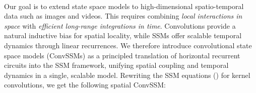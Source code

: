 \documentclass{article}
\begin{document}


\paragraph{} 
Our goal is to extend state space models to high-dimensional spatio-temporal data such as images and videos. This requires combining \emph{local interactions in space} with \emph{efficient long-range integrations in time}. Convolutions provide a natural inductive bias for spatial locality, while SSMs offer scalable temporal dynamics through linear recurrences. We therefore introduce convolutional state space models (ConvSSMs) as a principled translation of horizontal recurrent circuits into the SSM framework, unifying spatial coupling and temporal dynamics in a single, scalable model.
%
Rewriting the SSM equations () for kernel convolutions, we get the following spatial ConvSSM:
\end{document}
